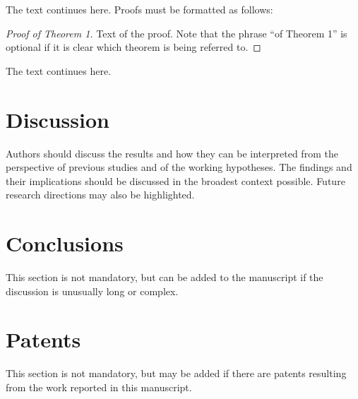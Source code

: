 \documentclass[journal,article,submit,pdftex,moreauthors]{Definitions/mdpi}
\begin{document}
The text continues here. Proofs must be formatted as follows:

\begin{proof}[Proof of Theorem 1]
Text of the proof. Note that the phrase ``of Theorem 1'' is optional if it is clear which theorem is being referred to.
\end{proof}
The text continues here.

\section{Discussion}

Authors should discuss the results and how they can be interpreted from the perspective of previous studies and of the working hypotheses. The findings and their implications should be discussed in the broadest context possible. Future research directions may also be highlighted.

\section{Conclusions}

This section is not mandatory, but can be added to the manuscript if the discussion is unusually long or complex.

\section{Patents}

This section is not mandatory, but may be added if there are patents resulting from the work reported in this manuscript.

\vspace{6pt} 


\end{document}
